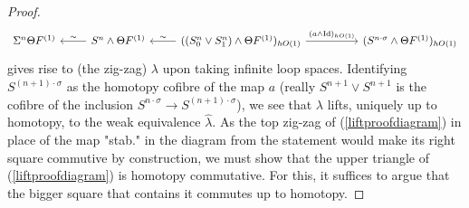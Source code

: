 \documentclass[a4paper, oneside]{amsart}
\newcommand{\Id}{\mathrm{Id}}
\newcommand{\1}{\mathds{1}}
\theoremstyle{remark}
\theoremstyle{definition}
\numberwithin{equation}{section}
\begin{document}
\begin{proof}
$$
\begin{tikzcd}
\Sigma^n\Theta F^{(1)} &\lar["\sim"']S^n\wedge \Theta F^{(1)}&\lar["\sim"']((S^n_0\vee S^n_1)\wedge \Theta F^{(1)})_{hO(1)}\ar[rr,"(a\wedge \Id)_{hO(1)}"] && (S^{n\cdot\sigma}\wedge\Theta F^{(1)})_{hO(1)}
\end{tikzcd}
$$
gives rise to (the zig-zag) $\lambda$ upon taking infinite loop spaces. Identifying $S^{(n+1)\cdot\sigma}$ as the homotopy cofibre of the map $a$ (really $S^{n+1}\vee S^{n+1}$ is the cofibre of the inclusion $S^{n\cdot\sigma}\to S^{(n+1)\cdot\sigma}$), we see that $\lambda$ lifts, uniquely up to homotopy, to the weak equivalence $\widehat\lambda$. As the top zig-zag of (\ref{liftproofdiagram}) in place of the map "stab." in the diagram from the statement would make its right square commutive by construction, we must show that the upper triangle of (\ref{liftproofdiagram}) is homotopy commutative. For this, it suffices to argue that the bigger square that contains it commutes up to homotopy. 


\end{proof}
\end{document}
